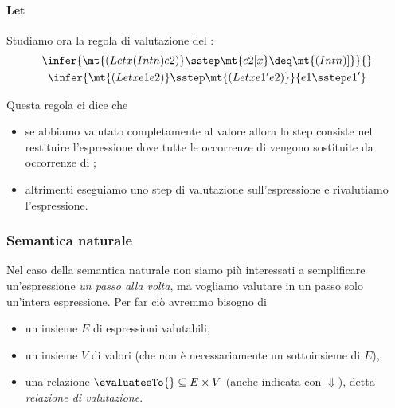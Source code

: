 \paragraph{Let} Studiamo ora la regola di valutazione del :
\begin{gather*}
    \infer{
        \mt{(Let x (Int n) e2)} \sstep \mt{e2[x} \deq \mt{(Int n)]}
    }{}\\
    \infer{
        \mt{(Let x e1 e2)} \sstep \mt{(Let x e1' e2)}
    }{
        e1 \sstep e1'
    }\\
\end{gather*}

Questa regola ci dice che \begin{itemize}
    \item se abbiamo valutato completamente  al valore  allora lo step consiste nel restituire l'espressione  dove tutte le occorrenze di  vengono sostituite da occorrenze di ;
    \item altrimenti eseguiamo uno step di valutazione sull'espressione  e rivalutiamo l'espressione.
\end{itemize}

\subsubsection{Semantica naturale}

Nel caso della semantica naturale non siamo più interessati a semplificare un'espressione \emph{un passo alla volta}, ma vogliamo valutare in un passo solo un'intera espressione. Per far ciò avremmo bisogno di
\begin{itemize}
    \item un insieme $E$ di espressioni valutabili,
    \item un insieme $V$ di valori (che non è necessariamente un sottoinsieme di $E$),
    \item una relazione $\evaluatesTo {}\subseteq E \times V$ (anche indicata con $\Downarrow$), detta \emph{relazione di valutazione}.
\end{itemize}

